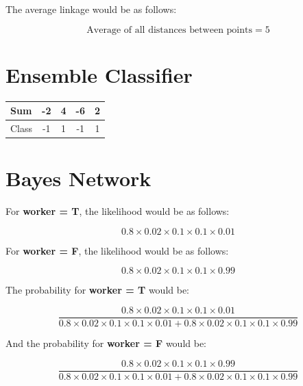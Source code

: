 \documentclass[12pt]{scrartcl}
\begin{document}
The average linkage would be as follows:

\begin{equation*}
    \text{Average of all distances between points} = 5
\end{equation*}

\section{Ensemble Classifier}

\begin{table}[H]
    \centering
    \begin{tabular}{|l|c|c|c|c|}
        \hline
        Sum & -2 & 4 & -6 & 2 \\\hline
        Class & -1 & 1 & -1 & 1 \\
        \hline
    \end{tabular}
\end{table}

\section{Bayes Network}
For \textbf{worker = T}, the likelihood would be as follows:

\begin{equation*}
    0.8 \times 0.02 \times 0.1 \times 0.1 \times 0.01
\end{equation*}

For \textbf{worker = F}, the likelihood would be as follows:

\begin{equation*}
    0.8 \times 0.02 \times 0.1 \times 0.1 \times 0.99
\end{equation*}

The probability for \textbf{worker = T} would be:

\begin{equation*}
    \frac{0.8 \times 0.02 \times 0.1 \times 0.1 \times 0.01}{0.8 \times 0.02 \times 0.1 \times 0.1 \times 0.01 + 0.8 \times 0.02 \times 0.1 \times 0.1 \times 0.99}
\end{equation*}

And the probability for \textbf{worker = F} would be:

\begin{equation*}
    \frac{0.8 \times 0.02 \times 0.1 \times 0.1 \times 0.99}{0.8 \times 0.02 \times 0.1 \times 0.1 \times 0.01 + 0.8 \times 0.02 \times 0.1 \times 0.1 \times 0.99}
\end{equation*}
\end{document}
